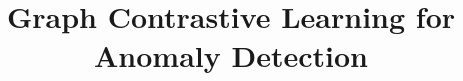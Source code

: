 \documentclass[10pt,journal,compsoc]{IEEEtran}
\begin{document}
%
\title{Graph Contrastive Learning for Anomaly Detection}
%
%
%
%


\end{document}
